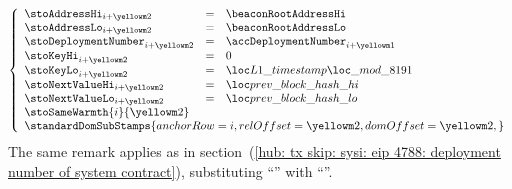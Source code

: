 \item[\underline{\underline{Storing the \inst{BLOCKHASH} in the state:}}] 
	\[
		\left\{ \begin{array}{lclr}
			\stoAddressHi         _{i + \roffTxSkipSysiBlockHashSystemContractStorage} & = & \beaconRootAddressHi                                                      \\
			\stoAddressLo         _{i + \roffTxSkipSysiBlockHashSystemContractStorage} & = & \beaconRootAddressLo                                                      \\
			\stoDeploymentNumber  _{i + \roffTxSkipSysiBlockHashSystemContractStorage} & = & \accDeploymentNumber _{i + \roffTxSkipSysiBlockHashSystemContractAccount} \\
			\stoKeyHi             _{i + \roffTxSkipSysiBlockHashSystemContractStorage} & = & 0                                                                         \\
			\stoKeyLo             _{i + \roffTxSkipSysiBlockHashSystemContractStorage} & = & \locLayerOneTimeStampModuloPrime                                          \\
			\stoNextValueHi       _{i + \roffTxSkipSysiBlockHashSystemContractStorage} & = & \locPreviousBlockHashHi                                                   \\
			\stoNextValueLo       _{i + \roffTxSkipSysiBlockHashSystemContractStorage} & = & \locPreviousBlockHashLo                                                   \\
			\multicolumn{3}{l}{\stoSameWarmth  {i}{\roffTxSkipSysiBlockHashSystemContractStorage} } \\
			\multicolumn{3}{l}{
				\standardDomSubStamps {
					anchorRow = i                                             ,
					relOffset = \roffTxSkipSysiBlockHashSystemContractStorage ,
					domOffset = \roffTxSkipSysiBlockHashSystemContractStorage ,
				}} \\
		\end{array} \right.
	\]
	\saNote{} \label{hub: tx skip: sysi: eip 2935: deployment number of system contract}
	The same remark applies as in
	section~(\ref{hub: tx skip: sysi: eip 4788: deployment number of system contract}),
	substituting
	``\beaconRootAddress''
	with
	``\blockHashAddress''.
